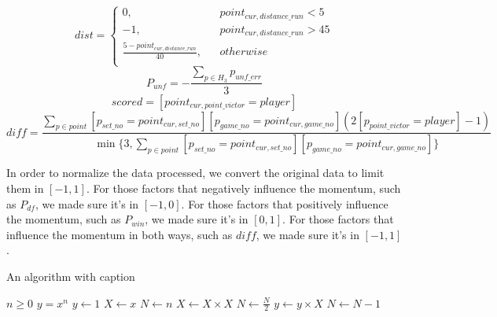\begin{equation}
    dist = \left\{
        \begin{aligned}
        0, && point_{cur, distance\_run} < 5 \\
        -1, && point_{cur, distance\_run} > 45 \\
        \frac{5 - point_{cur, distance\_run}}{40}, && otherwise \\
        \end{aligned}
        \right.
\end{equation}
\begin{equation}
    P_{unf} = -\frac{\sum_{p \in H_3} p_{unf\_err}}{3}
\end{equation}
\begin{equation}
    scored = [point_{cur, point\_victor} = player]
\end{equation}
\begin{equation}
    diff = \frac{\sum_{p \in point}[p_{set\_no} = point_{cur, set\_no}][p_{game\_no} = point_{cur, game\_no}](2[p_{point\_victor} = player]-1)}{\min\{3, \sum_{p \in point}[p_{set\_no} = point_{cur, set\_no}][p_{game\_no} = point_{cur, game\_no}]\}}
\end{equation}
\par In order to normalize the data processed, we convert the original data to limit them in $[-1, 1]$. For those factors that negatively influence the momentum, such as $P_{df}$, we made sure it's in $[-1, 0]$. For those factors that positively influence the momentum, such as $P_{win}$, we made sure it's in $[0, 1]$. For those factors that influence the momentum in both ways, such as $diff$, we made sure it's in $[-1, 1]$.

\begin{algorithm}
    \caption{An algorithm with caption}\label{alg:cap}
    \begin{algorithmic}
    \Require $n \geq 0$
    \Ensure $y = x^n$
    \State $y \gets 1$
    \State $X \gets x$
    \State $N \gets n$
        \State $X \gets X \times X$
        \State $N \gets \frac{N}{2}$  
        \State $y \gets y \times X$
        \State $N \gets N - 1$
    \EndIf
    \EndWhile
    \end{algorithmic}
\end{algorithm}
